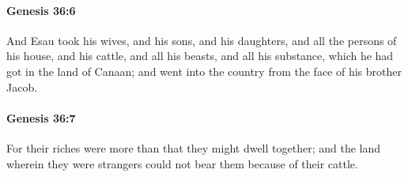 		\paragraph{Genesis 36:6} %
			\label{GENESIS-36-6}

			And Esau took his wives, and his sons, and his daughters, and all the persons of his house, and his cattle, and all his beasts, and all his substance, which he had got in the land of Canaan; and went into the country from the face of his brother Jacob.


		\paragraph{Genesis 36:7} %
			\label{GENESIS-36-7}

			For their riches were more than that they might dwell together; and the land wherein they were strangers could not bear them because of their cattle.

